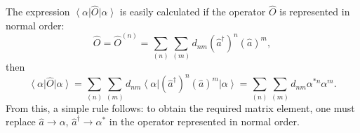 The expression $\left<\alpha\right|\hat{O}\left|\alpha\right>$ is easily
calculated if the operator $\hat{O}$ is represented in normal order:
\begin{equation}
\hat{O} = \hat{O}^{(n)} = \sum_{(n)}\sum_{(m)} d_{nm}
\left(\hat{a}^{\dag}\right)^n
\left(\hat{a}\right)^m,
\label{eqCh1_normalO}
\end{equation}
then
\begin{equation}
\left<\alpha\right|\hat{O}\left|\alpha\right> = 
\sum_{(n)}\sum_{(m)} d_{nm}
\left<\alpha\right|
\left(\hat{a}^{\dag}\right)^n
\left(\hat{a}\right)^m
\left|\alpha\right> = 
\sum_{(n)}\sum_{(m)} d_{nm}
\alpha^{*n}\alpha^{m}.
\end{equation}
From this, a simple rule follows: to obtain the required matrix element, one must replace $\hat{a}\rightarrow\alpha$, 
$\hat{a}^{\dag}\rightarrow\alpha^{*}$ in the operator represented in normal order.


